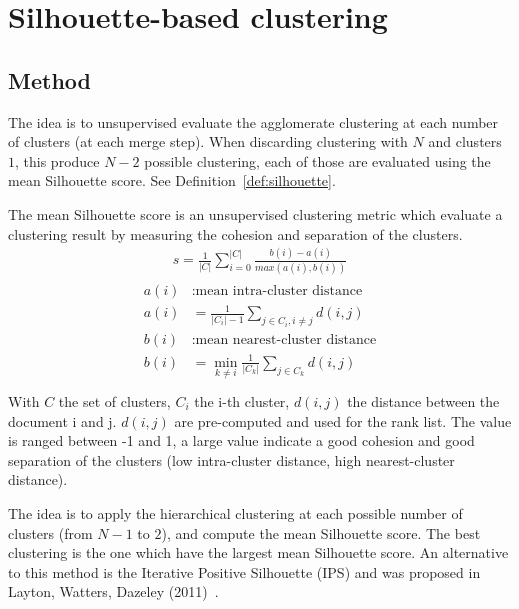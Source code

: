 \section{Silhouette-based clustering \label{sec:silhouette-based_clustering}}

\subsection{Method}

The idea is to unsupervised evaluate the agglomerate clustering at each number of clusters (at each merge step).
When discarding clustering with $N$ and clusters $1$, this produce $N - 2$ possible clustering, each of those are evaluated using the mean Silhouette score.
See Definition~\ref{def:silhouette}.

\begin{definition}
  \label{def:silhouette}
  The mean Silhouette score is an unsupervised clustering metric which evaluate a clustering result by measuring the cohesion and separation of the clusters.
  \begin{gather*}
    s = \frac{1}{|C|} \sum_{i = 0}^{|C|} \frac{b(i) - a(i)}{max(a(i), b(i))}
  \end{gather*}
  \begin{gather*}
    \begin{split}
      a(i)&: \text{mean intra-cluster distance} \\
      a(i)& = \frac{1}{|C_i| - 1} \sum_{j \in C_i, i\neq j} d(i, j) \\
      b(i)&: \text{mean nearest-cluster distance} \\
      b(i)& = \min_{k\neq i} \frac{1}{|C_k|} \sum_{j \in C_k} d(i, j) \\
    \end{split}
  \end{gather*}
  With $C$ the set of clusters, $C_i$ the i-th cluster, $d(i, j)$ the distance between the document i and j.
  $d(i, j)$ are pre-computed and used for the rank list.
  The value is ranged between -1 and 1, a large value indicate a good cohesion and good separation of the clusters (low intra-cluster distance, high nearest-cluster distance).
\end{definition}

The idea is to apply the hierarchical clustering at each possible number of clusters (from $N - 1$ to $2$), and compute the mean Silhouette score.
The best clustering is the one which have the largest mean Silhouette score.
An alternative to this method is the Iterative Positive Silhouette (IPS) and was proposed in Layton, Watters, Dazeley (2011)~\cite{automated_unsupervised}.

